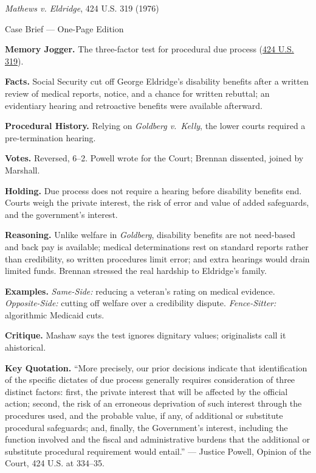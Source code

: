 \documentclass[12pt]{article}
\begin{document}
\begin{center}
{\Large \textit{Mathews v. Eldridge}, 424 U.S. 319 (1976)\par}
\vspace{0.3em}
{\normalsize Case Brief --- One-Page Edition\par}
\end{center}

\textbf{Memory Jogger.} The three-factor test for procedural due process (\href{https://supreme.justia.com/cases/federal/us/424/319/}{424 U.S. 319}).

\textbf{Facts.} Social Security cut off George Eldridge's disability benefits after a written review of medical reports, notice, and a chance for written rebuttal; an evidentiary hearing and retroactive benefits were available afterward.

\textbf{Procedural History.} Relying on \textit{Goldberg v.\ Kelly}, the lower courts required a pre-termination hearing.

\textbf{Votes.} Reversed, 6--2. Powell wrote for the Court; Brennan dissented, joined by Marshall.

\textbf{Holding.} Due process does not require a hearing before disability benefits end. Courts weigh the private interest, the risk of error and value of added safeguards, and the government's interest.

\textbf{Reasoning.} Unlike welfare in \textit{Goldberg}, disability benefits are not need-based and back pay is available; medical determinations rest on standard reports rather than credibility, so written procedures limit error; and extra hearings would drain limited funds. Brennan stressed the real hardship to Eldridge's family.

\textbf{Examples.} \emph{Same-Side:} reducing a veteran's rating on medical evidence. \emph{Opposite-Side:} cutting off welfare over a credibility dispute. \emph{Fence-Sitter:} algorithmic Medicaid cuts.

\textbf{Critique.} Mashaw says the test ignores dignitary values; originalists call it ahistorical.

\textbf{Key Quotation.} ``More precisely, our prior decisions indicate that identification of the specific dictates of due process generally requires consideration of three distinct factors: first, the private interest that will be affected by the official action; second, the risk of an erroneous deprivation of such interest through the procedures used, and the probable value, if any, of additional or substitute procedural safeguards; and, finally, the Government's interest, including the function involved and the fiscal and administrative burdens that the additional or substitute procedural requirement would entail.'' --- Justice Powell, Opinion of the Court, 424 U.S. at 334--35.
\end{document}
